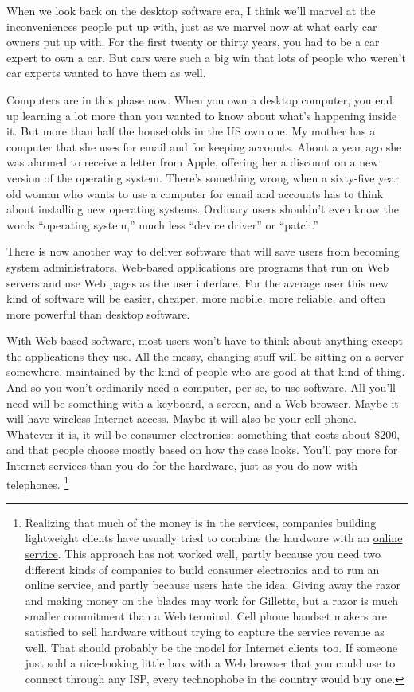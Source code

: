 When we look back on the desktop software era, I think we'll marvel at
the inconveniences people put up with, just as we marvel now at what
early car owners put up with. For the first twenty or thirty years, you
had to be a car expert to own a car. But cars were such a big win that
lots of people who weren't car experts wanted to have them as well.

Computers are in this phase now. When you own a desktop computer, you
end up learning a lot more than you wanted to know about what's
happening inside it. But more than half the households in the US own
one. My mother has a computer that she uses for email and for keeping
accounts. About a year ago she was alarmed to receive a letter from
Apple, offering her a discount on a new version of the operating system.
There's something wrong when a sixty-five year old woman who wants to
use a computer for email and accounts has to think about installing new
operating systems. Ordinary users shouldn't even know the words
``operating system,'' much less ``device driver'' or ``patch.''

There is now another way to deliver software that will save users from
becoming system administrators. Web-based applications are programs that
run on Web servers and use Web pages as the user interface. For the
average user this new kind of software will be easier, cheaper, more
mobile, more reliable, and often more powerful than desktop software.

With Web-based software, most users won't have to think about anything
except the applications they use. All the messy, changing stuff will be
sitting on a server somewhere, maintained by the kind of people who are
good at that kind of thing. And so you won't ordinarily need a computer,
per se, to use software. All you'll need will be something with a
keyboard, a screen, and a Web browser. Maybe it will have wireless
Internet access. Maybe it will also be your cell phone. Whatever it is,
it will be consumer electronics: something that costs about \$200, and
that people choose mostly based on how the case looks. You'll pay more
for Internet services than you do for the hardware, just as you do now
with telephones. \footnote{Realizing that much of the money is in the services, companies
building lightweight clients have usually tried to combine the hardware
with an \href{http://news.cnet.com/news/0-1006-200-3622600.html}{online
service}. This approach has not worked well, partly because you need two
different kinds of companies to build consumer electronics and to run an
online service, and partly because users hate the idea. Giving away the
razor and making money on the blades may work for Gillette, but a razor
is much smaller commitment than a Web terminal. Cell phone handset
makers are satisfied to sell hardware without trying to capture the
service revenue as well. That should probably be the model for Internet
clients too. If someone just sold a nice-looking little box with a Web
browser that you could use to connect through any ISP, every technophobe
in the country would buy one.}

